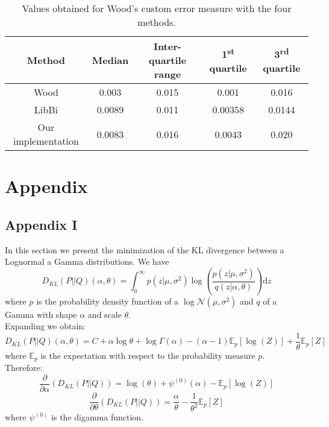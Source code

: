 \documentclass{article}
\newcommand{\ra}[1]{\renewcommand{\arraystretch}{#1}}
\begin{document}
\clearpage
	\begin{table}[htb]
		\centering
		\ra{1.3}
		\begin{tabular}{@{}ccccc@{}} \toprule
			Method & Median &  Inter-quartile range & 1\textsuperscript{st} quartile & 3\textsuperscript{rd} quartile \\ \midrule 
			Wood & 0.003 & 0.015 & 0.001 & 0.016\\ 
			LibBi & 0.0089 & 0.011 & 0.00358 & 0.0144 \\ 
			Our implementation & 0.0083 &  0.016 & 0.0043 & 0.020\\ \bottomrule
		\end{tabular}
		\caption{Values obtained for Wood's custom error measure with the four methods.}
		\label{table:metric}
	\end{table}

\clearpage

	
	{}
	
	\section{Appendix}
	\subsection{Appendix I} \label{KLRicker}
	In this section we present the minimization of the KL divergence between a Lognormal a Gamma distributions.
	We have
	\begin{equation*}
	D_{KL}(P||Q)(\alpha, \theta) = \int_{0}^{\infty}{p(z|\mu, \sigma^2)\log(\frac{p(z|\mu, \sigma^2)}{q(z|\alpha, \theta)})\mathrm{d}z}
	\end{equation*}
	where $p$ is the probability density function of a $\log\mathcal{N}(\mu, \sigma^2)$ and $q$ of a Gamma with shape $\alpha$ and scale $\theta$. \\
	Expanding we obtain:
	\begin{equation*}
	D_{KL}(P||Q)(\alpha, \theta) = C + \alpha\log\theta + \log\Gamma(\alpha) - (\alpha-1)\mathbb{E}_p[\log(Z)] + \frac{1}{\theta}\mathbb{E}_p[Z]
	\end{equation*}
	where $\mathbb{E}_p$ is the expectation with respect to the probability measure $p$.\\
	Therefore:
	\begin{equation*}
	\frac{\partial }{\partial \alpha}(D_{KL}(P||Q)) = \log(\theta) + \psi^{(0)}(\alpha)-\mathbb{E}_p[\log(Z)]
	\end{equation*}
	\begin{equation*}
	\frac{\partial }{\partial \theta}(D_{KL}(P||Q)) = \frac{\alpha}{\theta} - \frac{1}{\theta^2}\mathbb{E}_p[Z]
	\end{equation*}
	where $\psi^{(0)}$ is the digamma function.
	
\end{document}
